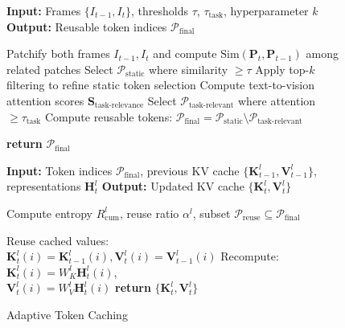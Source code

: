 \begin{figure}[t]
\centering
\begin{minipage}{0.48\textwidth}
\begin{algorithm}[H]
\caption{Dynamic Token Selection}
\label{alg:dynamic_token_selection}
\begin{algorithmic}[1]
\STATE \textbf{Input:} Frames $\{I_{t-1}, I_t\}$, thresholds $\tau$, $\tau_{\text{task}}$, hyperparameter $k$
\STATE \textbf{Output:} Reusable token indices $\mathcal{P}_{\mathrm{final}}$

\STATE \textcolor{mygreen}{}
\STATE Patchify both frames $I_{t-1}, I_t$ and compute $\text{Sim}(\mathbf{P}_t, \mathbf{P}_{t-1})$ among related patches
\STATE Select $\mathcal{P}_{\text{static}}$ where similarity $\geq \tau$
\STATE Apply top-$k$ filtering to refine static token selection
\STATE \textcolor{mygreen}{}
\STATE Compute text-to-vision attention scores $\mathbf{S}_{\text{task-relevance}}$
\STATE Select $\mathcal{P}_{\text{task-relevant}}$ where attention $\geq \tau_{\text{task}}$
\STATE Compute reusable tokens: $\mathcal{P}_{\mathrm{final}} = \mathcal{P}_{\text{static}} \setminus \mathcal{P}_{\text{task-relevant}}$

\STATE \textbf{return} $\mathcal{P}_{\mathrm{final}}$
\end{algorithmic}
\vskip 0.04in
\end{algorithm}
\end{minipage}
\hfill
\begin{minipage}{0.48\textwidth}
\begin{algorithm}[H]
\caption{Adaptive Token Caching}
\label{alg:adaptive_token_caching}
\begin{algorithmic}[1]
\STATE \textbf{Input:} Token indices $\mathcal{P}_{\mathrm{final}}$, previous KV cache $\{\mathbf{K}_{t-1}^l, \mathbf{V}_{t-1}^l\}$, representations $\mathbf{H}_t^l$
\STATE \textbf{Output:} Updated KV cache $\{\mathbf{K}_t^l, \mathbf{V}_t^l\}$

\STATE Compute entropy $R_{\text{cum}}^l$, reuse ratio $\alpha^l$, subset $\mathcal{P}_{\mathrm{reuse}} \subseteq \mathcal{P}_{\mathrm{final}}$

    \STATE Reuse cached values: \\
           $\mathbf{K}_t^l(i) = \mathbf{K}_{t-1}^l(i), \mathbf{V}_t^l(i) = \mathbf{V}_{t-1}^l(i)$
    \ELSE
    \STATE Recompute:\\$\mathbf{K}_t^l(i) = W_K^l \mathbf{H}_t^l(i)$, \\ $\mathbf{V}_t^l(i) = W_V^l \mathbf{H}_t^l(i)$
    \ENDIF
\ENDFOR
\STATE \textbf{return} $\{\mathbf{K}_t^l, \mathbf{V}_t^l\}$
\end{algorithmic}
\vskip -0.02in
\end{algorithm}
\end{minipage}
\label{fig:dual_algorithm}
\vskip -0.2in
\end{figure}

